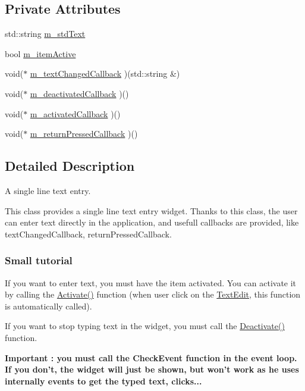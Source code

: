 \subsection*{Private Attributes}
\begin{CompactItemize}
\item 
std::string \hyperlink{classsfgui_1_1TextEdit_08de851a32aa8dd650e33dfcb376bfd8}{m\_\-stdText}
\item 
bool \hyperlink{classsfgui_1_1TextEdit_8ffa5546b2fd4901837b13a118f9beef}{m\_\-itemActive}
\item 
void($\ast$ \hyperlink{classsfgui_1_1TextEdit_a6d415ef1daf7f9fdf0dec3d71cb8eab}{m\_\-textChangedCallback} )(std::string \&)
\item 
void($\ast$ \hyperlink{classsfgui_1_1TextEdit_bfa97d7c95f54cc91600375242fe1ea6}{m\_\-deactivatedCallback} )()
\item 
void($\ast$ \hyperlink{classsfgui_1_1TextEdit_9cf910f9fca635f595d6a8963d7e30d1}{m\_\-activatedCallback} )()
\item 
void($\ast$ \hyperlink{classsfgui_1_1TextEdit_d86f9eaadf1313214631b2de009abf55}{m\_\-returnPressedCallback} )()
\end{CompactItemize}


\subsection{Detailed Description}
A single line text entry. 

This class provides a single line text entry widget. Thanks to this class, the user can enter text directly in the application, and usefull callbacks are provided, like textChangedCallback, returnPressedCallback.

\subsubsection*{Small tutorial}

If you want to enter text, you must have the item activated. You can activate it by calling the \hyperlink{classsfgui_1_1TextEdit_bcd256e053ae8f13a5c7f919f79c03c9}{Activate()} function (when user click on the \hyperlink{classsfgui_1_1TextEdit}{TextEdit}, this function is automatically called). \par
 If you want to stop typing text in the widget, you must call the \hyperlink{classsfgui_1_1TextEdit_49b0919fd6c43c35913f8a46a6788270}{Deactivate()} function. \par
 {\bf Important : you must call the CheckEvent function in the event loop. If you don't, the widget will just be shown, but won't work as he uses internally events to get the typed text, clicks...} 

